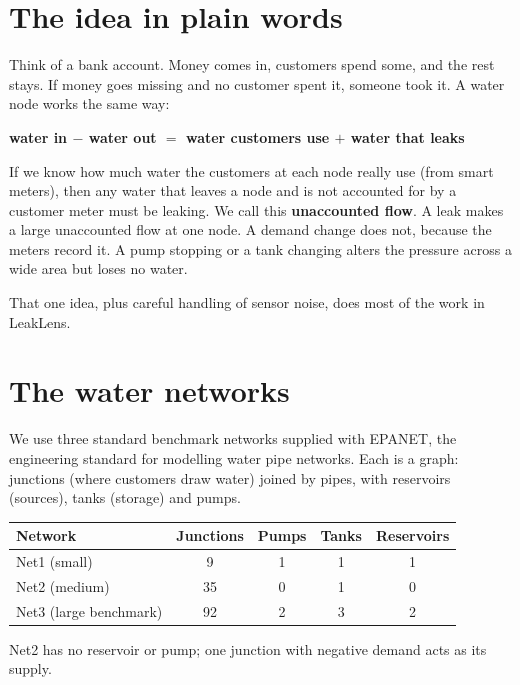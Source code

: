 \documentclass[11pt,a4paper]{article}
\begin{document}
\section{The idea in plain words}
Think of a bank account. Money comes in, customers spend some, and the rest stays. If money goes missing and no customer spent it, someone took it. A water node works the same way:

\begin{center}\textbf{water in $-$ water out $=$ water customers use $+$ water that leaks}\end{center}

If we know how much water the customers at each node really use (from smart meters), then any water that leaves a node and is not accounted for by a customer meter must be leaking. We call this \textbf{unaccounted flow}. A leak makes a large unaccounted flow at one node. A demand change does not, because the meters record it. A pump stopping or a tank changing alters the pressure across a wide area but loses no water.

That one idea, plus careful handling of sensor noise, does most of the work in LeakLens.

\section{The water networks}
We use three standard benchmark networks supplied with EPANET, the engineering standard for modelling water pipe networks. Each is a graph: junctions (where customers draw water) joined by pipes, with reservoirs (sources), tanks (storage) and pumps.
\begin{center}\small\begin{tabular}{@{}lcccc@{}}\toprule
Network & Junctions & Pumps & Tanks & Reservoirs \\\midrule
Net1 (small) & 9 & 1 & 1 & 1 \\
Net2 (medium) & 35 & 0 & 1 & 0 \\
Net3 (large benchmark) & 92 & 2 & 3 & 2 \\\bottomrule\end{tabular}\end{center}
Net2 has no reservoir or pump; one junction with negative demand acts as its supply.
\end{document}
